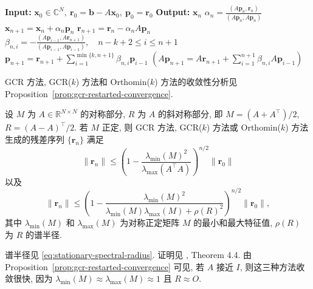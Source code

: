 \begin{algorithm}[H]\caption{{Orthomin($k$) 方法}}\label{alg:orthomin}\begin{algorithmic}[1]
\Statex\textbf{Input:} $\bm x_0\in\mathbb C^N,\ \bm r_0=\bm b-A\bm x_0,\ \bm p_0=\bm r_0$
\Statex\textbf{Output:} $\bm x_n$
\State $\alpha_n=\frac{(A\bm p_n,\bm r_n)}{(A\bm p_n,A\bm p_n)}$
\State $\bm x_{n+1}=\bm x_n+\alpha_n\bm p_n$
\State $\bm r_{n+1}=\bm r_n-\alpha_nA\bm p_n$
\State $\beta_{n,i}=-\frac{(A\bm p_{i-1},A\bm r_{n+1})}{(A\bm p_{i-1},A\bm p_{i-1})},\quad n-k+2\le i\le n+1$
\State $\bm p_{n+1}=\bm r_{n+1}+\sum_{i=1}^{\min\{k,n+1\}}\beta_{n,i}\bm p_{i-1}$
\State $(A\bm p_{n+1}=A\bm r_{n+1}+\sum_{i=1}^{n+1}\beta_{n,i}A\bm p_{i-1})$
\EndFor\end{algorithmic}\end{algorithm}
{GCR 方法, GCR($k$) 方法和 Orthomin($k$) 方法的收敛性分析见 Proposition\ \ref{prop:gcr-restarted-convergence}.}
\par{}
\begin{Proposition}\label{prop:gcr-restarted-convergence}
{设 $M$ 为 $A\in\mathbb R^{N\times N}$ 的对称部分, $R$ 为 $A$ 的斜对称部分, 即 $M=(A+A^{\top})/2$, $R=(A-A)^{\top}/2$. 若 $M$ 正定, 则 GCR 方法, GCR($k$) 方法或 Orthomin($k$) 方法生成的残差序列 $\{\bm r_n\}$ 满足}
\[\|\bm r_n\|\le\left(1-\frac{\lambda_{\min}(M)^2}{\lambda_{\max}(A^{\top}A)}\right)^{n/2}\|\bm r_0\|\]
{以及}
\[\|\bm r_n\|\le\left(1-\frac{\lambda_{\min}(M)^2}{\lambda_{\min}(M)\lambda_{\max}(M)+\rho(R)^2}\right)^{n/2}\|\bm r_0\|,\]
{其中 $\lambda_{\min}(M)$ 和 $\lambda_{\max}(M)$ 为对称正定矩阵 $M$ 的最小和最大特征值, $\rho(R)$ 为 $R$ 的谱半径.}
\end{Proposition}
{谱半径见 \eqref{eq:stationary-spectral-radius}. 证明见 , Theorem 4.4.}
{由 Proposition\ \ref{prop:gcr-restarted-convergence} 可见, 若 $A$ 接近 $I$, 则这三种方法收敛很快, 因为 $\lambda_{\min}(M)\approx\lambda_{\max}(M)\approx1$ 且 $R\approx O$.}

